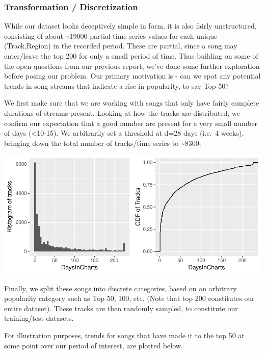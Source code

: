 \documentclass[]{article}
\begin{document}
\subsubsection{Transformation /
Discretization}\label{transformation-discretization}

While our dataset looks deceptively simple in form, it is also fairly
unstructured, consisting of about \textasciitilde{}19000 partial time
series values for each unique (Track,Region) in the recorded period.
These are partial, since a song may enter/leave the top 200 for only a
small period of time. Thus building on some of the open questions from
our previous report, we've done some further exploration before posing
our problem. Our primary motivation is - can we spot any potential
trends in song streams that indicate a rise in popularity, to say Top
50?

We first make sure that we are working with songs that only have fairly
complete durations of streams present. Looking at how the tracks are
distributed, we confirm our expectation that a good number are present
for a very small number of days (\textless{}10-15). We arbitrarily set a
threshold at d=28 days (i.e.~4 weeks), bringing down the total number of
tracks/time series to \textasciitilde{}8300.

\includegraphics{report-2_files/figure-latex/tsdurations-1.pdf}

Finally, we split these songs into discrete categories, based on an
arbitrary popularity category such as Top 50, 100, etc. (Note that top
200 constitutes our entire dataset). These tracks are then randomly
sampled, to constitute our training/test datasets.

For illustration purposes, trends for songs that have made it to the top
50 at some point over our period of interest, are plotted below.
\end{document}
